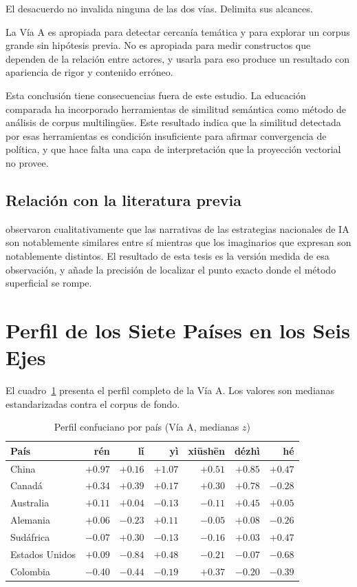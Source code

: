 El desacuerdo no invalida ninguna de las dos vías. Delimita sus alcances.

La Vía A es apropiada para detectar cercanía temática y para explorar un corpus grande sin hipótesis previa. No es apropiada para medir constructos que dependen de la relación entre actores, y usarla para eso produce un resultado con apariencia de rigor y contenido erróneo.

Esta conclusión tiene consecuencias fuera de este estudio. La educación comparada ha incorporado herramientas de similitud semántica como método de análisis de corpus multilingües. Este resultado indica que la similitud detectada por esas herramientas es condición insuficiente para afirmar convergencia de política, y que hace falta una capa de interpretación que la proyección vectorial no provee.

\subsection{Relación con la literatura previa}

\citet{bareis2022talking} observaron cualitativamente que las narrativas de las estrategias nacionales de IA son notablemente similares entre sí mientras que los imaginarios que expresan son notablemente distintos. El resultado de esta tesis es la versión medida de esa observación, y añade la precisión de localizar el punto exacto donde el método superficial se rompe.

\section{Perfil de los Siete Países en los Seis Ejes}

El cuadro~\ref{tab:radar} presenta el perfil completo de la Vía A. Los valores son medianas estandarizadas contra el corpus de fondo.

\begin{table}[htbp]
\centering
\small
\caption{Perfil confuciano por país (Vía A, medianas $z$)}
\label{tab:radar}
\begin{tabular}{lrrrrrr}
\hline
\textbf{País} & \textbf{rén} & \textbf{lǐ} & \textbf{yì} & \textbf{xiūshēn} & \textbf{dézhì} & \textbf{hé} \\
\hline
China & $+0.97$ & $+0.16$ & $+1.07$ & $+0.51$ & $+0.85$ & $+0.47$ \\
Canadá & $+0.34$ & $+0.39$ & $+0.17$ & $+0.30$ & $+0.78$ & $-0.28$ \\
Australia & $+0.11$ & $+0.04$ & $-0.13$ & $-0.11$ & $+0.45$ & $+0.05$ \\
Alemania & $+0.06$ & $-0.23$ & $+0.11$ & $-0.05$ & $+0.08$ & $-0.26$ \\
Sudáfrica & $-0.07$ & $+0.30$ & $-0.13$ & $-0.16$ & $+0.03$ & $+0.47$ \\
Estados Unidos & $+0.09$ & $-0.84$ & $+0.48$ & $-0.21$ & $-0.07$ & $-0.68$ \\
Colombia & $-0.40$ & $-0.44$ & $-0.19$ & $+0.37$ & $-0.20$ & $-0.39$ \\
\hline
\end{tabular}
\end{table}

